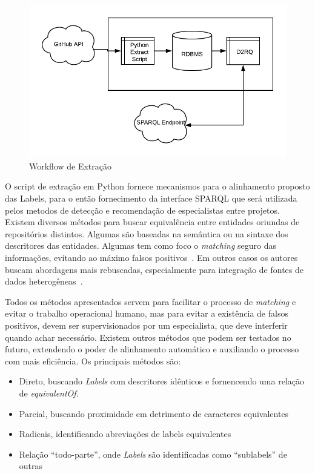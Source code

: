 \documentclass[sigconf]{acmart}
\begin{document}
\begin{figure}[!htbp]
 \centering
 \includegraphics[width=\columnwidth]{workflow_ontologia}
 \caption{Workflow de Extração}\label{fig:workflow_ontologia}
\end{figure}


O script de extração em Python fornece mecanismos para o alinhamento proposto das Labels, para o então fornecimento da interface SPARQL que será utilizada pelos metodos de detecção e recomendação de especialistas entre projetos. Existem diversos métodos para buscar equivalência entre entidades oriundas de repositórios distintos. Algumas são baseadas na semântica ou na sintaxe dos descritores das entidades. Algumas tem como foco o \textit{matching} seguro das informações, evitando ao máximo falsos positivos~\cite{vasilescu2013}. Em outros casos os autores buscam abordagens mais rebuscadas, especialmente para integração de fontes de dados heterogêneas~\cite{silvestri2015}.

Todos os métodos apresentados servem para facilitar o processo de \textit{matching} e evitar o trabalho operacional humano, mas para evitar a existência de falsos positivos, devem ser supervisionados por um especialista, que deve interferir quando achar necessário. Existem outros métodos que podem ser testados no futuro, extendendo o poder de alinhamento automático e auxiliando o processo com mais eficiência. Os principais métodos são:

\begin{itemize}
  \item Direto, buscando \textit{Labels} com descritores idênticos e fornencendo uma relação de \textit{equivalentOf}.
  \item Parcial, buscando proximidade em detrimento de caracteres equivalentes
  \item Radicais, identificando abreviações de labels equivalentes
  \item Relação ``todo-parte'', onde \textit{Labels} são identificadas como ``sublabels'' de outras
\end{itemize}
\end{document}
